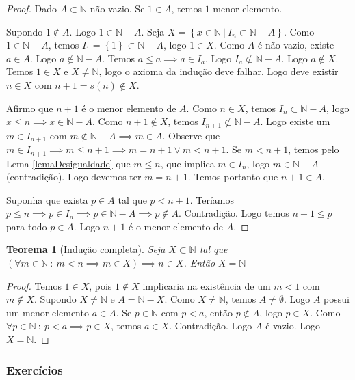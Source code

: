 \documentclass{article}
\theoremstyle{theorem}
\newtheorem{teo}{Teorema}
\theoremstyle{lemma}
\theoremstyle{definition}
\theoremstyle{remark}
\begin{document}
\begin{proof}
	Dado $A\subset \mathbb{N}$ não vazio. Se $1\in A$, temos $1$ menor elemento.  

	Supondo $1\not \in A$. Logo $1\in \mathbb{N} - A$.  Seja $X = \left\{ x \in \mathbb{N} \: | \:  I_n \subset \mathbb{N} - A \right\}$.   Como $1\in \mathbb{N} - A$, temos $I_1 = \left\{1\right\} \subset \mathbb{N} - A$, logo $1 \in X$.   Como  $A$ é não vazio, existe $a\in A$. Logo $a\not \in \mathbb{N} -A$.  Temos $a\leq a \implies a\in I_a$. Logo $I_a \not \subset \mathbb{N} - A$.   Logo $a \not \in X$. Temos $1 \in X$ e $X\neq \mathbb{N}$, logo o axioma da indução deve falhar. Logo deve existir $n\in X$ com $n+1 = s(n)\not \in X$. 

	Afirmo que $n+1$ é o menor elemento de $A$.  Como $n\in X$, temos $I_n \subset \mathbb{N} - A$, logo $x \leq n \implies x \in \mathbb{N} - A$. Como $n+1\not \in X$, temos $I_{n+1} \not \subset \mathbb{N} - A$.  Logo existe um $m \in I_{n+1}$ com $m\not \in \mathbb{N} - A\implies m  \in A$. Observe que $m\in I_{n+1} \implies m \leq n+1 \implies m = n+1 \lor m<n+1$. Se $m < n+1$, temos pelo Lema \ref{lemaDesigualdade} que $m\leq n$, que implica $m\in I_{n}$, logo $m\in \mathbb{N} - A$ (contradição). Logo devemos ter $m = n+1$. Temos portanto que $n+1\in A$. 


	Suponha que exista $p \in A$ tal que $p < n+1$.  Teríamos $p\leq n \implies p \in I_n \implies p \in \mathbb{N} -A \implies p \not \in A$. Contradição. Logo temos $n+1\leq p$ para todo $p\in A$. Logo $n+1$ é o menor elemento de $A$.
\end{proof}
\begin{teo}[Indução completa]
	Seja $X \subset \mathbb{N}$ tal que $( \forall m \in \mathbb{N} \: : \: m < n \implies m\in X) \implies n \in X $. Então $X = \mathbb{N}$
\end{teo}
\begin{proof}
	Temos $1 \in X$, pois $1\not \in X$ implicaria na existência de um $m < 1$ com $m\not \in X$.    Supondo $X\neq \mathbb{N}$ e $A = \mathbb{N} - X$. Como $X\neq \mathbb{N}$, temos $A \neq \emptyset$. Logo $A$ possui um menor elemento $a\in A$.  Se $p\in \mathbb{N}$ com $p < a $, então $p \not \in A$, logo $p\in X$. Como $ \forall p \in \mathbb{N} \: : \: p < a \implies p \in X$, temos $a \in X$. Contradição. Logo $A$ é vazio. Logo $X = \mathbb{N}$.
\end{proof}

\subsubsection{Exercícios}
\end{document}
